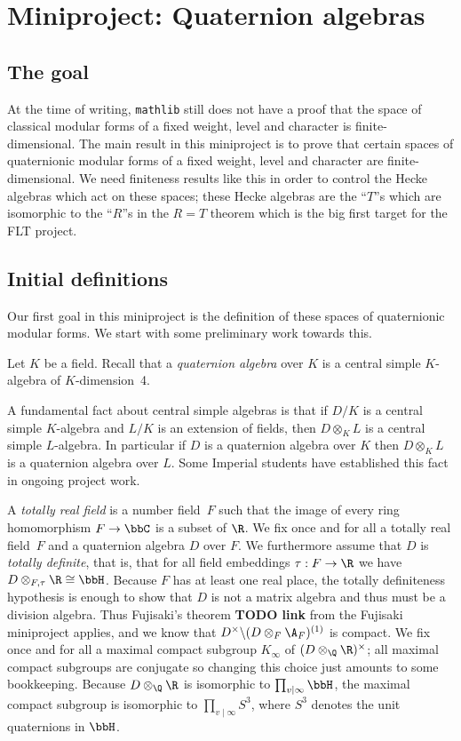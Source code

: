 \chapter{Miniproject: Quaternion algebras}\label{Quat_alg_project}

\section{The goal}

At the time of writing, {\tt mathlib} still does not have a proof that the space
of classical modular forms of a fixed weight, level and character is finite-dimensional.
The main result in this miniproject is to prove that certain spaces of quaternionic modular forms
of a fixed weight, level and character are finite-dimensional. We need finiteness results
like this in order to control the Hecke algebras which act on these spaces; these Hecke
algebras are the ``$T$''s which are isomorphic to the ``$R$''s in the $R=T$ theorem which
is the big first target for the FLT project.

\section{Initial definitions}

Our first goal in this miniproject is the definition of these spaces of quaternionic modular forms.
We start with some preliminary work towards this.

Let $K$ be a field. Recall that a \emph{quaternion algebra}
over $K$ is a central simple $K$-algebra of $K$-dimension~4.

A fundamental fact about central simple algebras is that if $D/K$
is a central simple $K$-algebra and $L/K$ is an extension of fields, then $D\otimes_KL$
is a central simple $L$-algebra. In particular if $D$ is a quaternion algebra over $K$
then $D\otimes_KL$ is a quaternion algebra over $L$. Some Imperial students have established
this fact in ongoing project work.

A \emph{totally real field} is a number field~$F$ such that the image of every ring
homomorphism $F\to\bbC$ is a subset of $\R$. We fix once and for all a totally real field~$F$ and a
quaternion algebra $D$ over $F$. We furthermore assume that $D$ is \emph{totally definite}, that is,
that for all field embeddings $\tau:F\to\R$ we have $D\otimes_{F,\tau}\R\cong\bbH$. Because $F$
has at least one real place, the totally definiteness hypothesis is enough to show that $D$
is not a matrix algebra and thus must be a division algebra. Thus Fujisaki's theorem {\bf TODO link}
from the Fujisaki miniproject applies, and we know that $D^\times\backslash (D\otimes_F\A_F)^{(1)}$
is compact. We fix once and for all a maximal compact subgroup $K_\infty$ of
$(D\otimes_{\Q}\R)^\times$; all maximal compact subgroups are conjugate so changing this choice
just amounts to some
bookkeeping. Because $D\otimes_{\Q}\R$ is isomorphic to $\prod_{v\mid\infty}\bbH$, the maximal
compact subgroup is isomorphic to $\prod_{v\mid\infty}S^3$, where $S^3$ denotes the unit
quaternions in $\bbH$.

